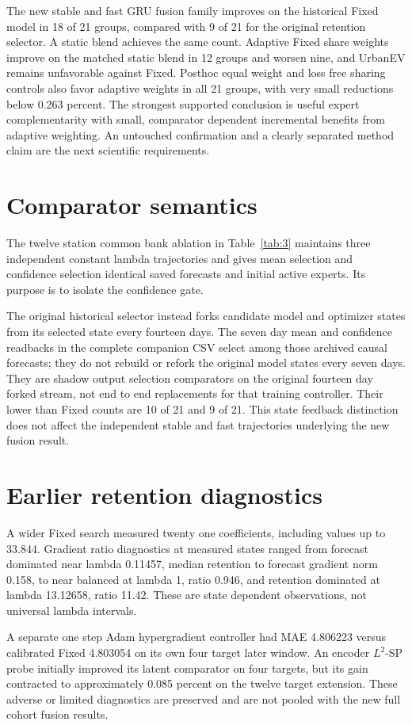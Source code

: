 \documentclass[pdflatex,iicol,sn-mathphys-num]{sn-jnl}
\begin{document}
The new stable and fast GRU fusion family improves on the historical Fixed model in 18 of 21 groups, compared with 9 of 21 for the original retention selector. A static blend achieves the same count. Adaptive Fixed share weights improve on the matched static blend in 12 groups and worsen nine, and UrbanEV remains unfavorable against Fixed. Posthoc equal weight and loss free sharing controls also favor adaptive weights in all 21 groups, with very small reductions below 0.263 percent. The strongest supported conclusion is useful expert complementarity with small, comparator dependent incremental benefits from adaptive weighting. An untouched confirmation and a clearly separated method claim are the next scientific requirements.

\appendix

\section{Comparator semantics}

The twelve station common bank ablation in Table~\ref{tab:3} maintains three independent constant lambda trajectories and gives mean selection and confidence selection identical saved forecasts and initial active experts. Its purpose is to isolate the confidence gate.

The original historical selector instead forks candidate model and optimizer states from its selected state every fourteen days. The seven day mean and confidence readbacks in the complete companion CSV select among those archived causal forecasts; they do not rebuild or refork the original model states every seven days. They are shadow output selection comparators on the original fourteen day forked stream, not end to end replacements for that training controller. Their lower than Fixed counts are 10 of 21 and 9 of 21. This state feedback distinction does not affect the independent stable and fast trajectories underlying the new fusion result.

\section{Earlier retention diagnostics}

A wider Fixed search measured twenty one coefficients, including values up to 33.844. Gradient ratio diagnostics at measured states ranged from forecast dominated near lambda 0.11457, median retention to forecast gradient norm 0.158, to near balanced at lambda 1, ratio 0.946, and retention dominated at lambda 13.12658, ratio 11.42. These are state dependent observations, not universal lambda intervals.

A separate one step Adam hypergradient controller had MAE 4.806223 versus calibrated Fixed 4.803054 on its own four target later window. An encoder $L^2$-SP probe initially improved its latent comparator on four targets, but its gain contracted to approximately 0.085 percent on the twelve target extension. These adverse or limited diagnostics are preserved and are not pooled with the new full cohort fusion results.
\FloatBarrier
\clearpage
\backmatter
\balance

\end{document}
